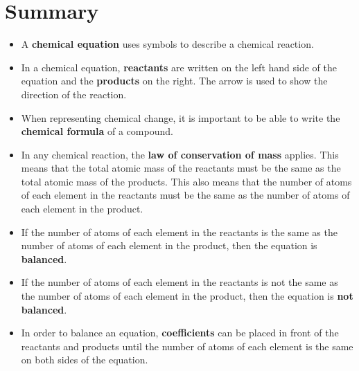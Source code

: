             \section{Summary}
            \nopagebreak
      \label{m38727*id67171}\begin{itemize}[noitemsep]
            \label{m38727*uid36}\item A \textbf{chemical equation} uses symbols to describe a chemical reaction.
\label{m38727*uid37}\item In a chemical equation, \textbf{reactants} are written on the left hand side of the equation and the \textbf{products} on the right. The arrow is used to show the direction of the reaction.
\label{m38727*uid38}\item When representing chemical change, it is important to be able to write the \textbf{chemical formula} of a compound.
\label{m38727*uid39}\item In any chemical reaction, the \textbf{law of conservation of mass} applies. This means that the total atomic mass of the reactants must be the same as the total atomic mass of the products. This also means that the number of atoms of each element in the reactants must be the same as the number of atoms of each element in the product.
\label{m38727*uid40}\item If the number of atoms of each element in the reactants is the same as the number of atoms of each element in the product, then the equation is \textbf{balanced}.
\label{m38727*uid41}\item If the number of atoms of each element in the reactants is not the same as the number of atoms of each element in the product, then the equation is \textbf{not balanced}.
\label{m38727*uid42}\item In order to balance an equation, \textbf{coefficients} can be placed in front of the reactants and products until the number of atoms of each element is the same on both sides of the equation.
\end{itemize}
\label{m38727*secfhsst!!!underscore!!!id1434}
